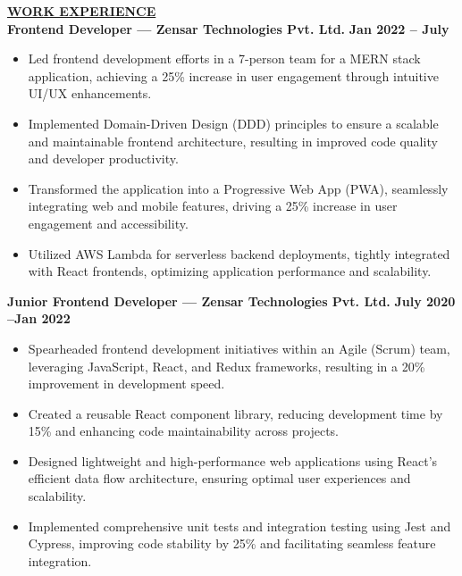 \documentclass{article}
\begin{document}

\noindent \textbf{\underline{WORK EXPERIENCE}} \\
\noindent \textbf{Frontend Developer — Zensar Technologies Pvt. Ltd.}
\hfill \textbf{Jan 2022 – July}
\begin{itemize}[noitemsep,nolistsep,leftmargin=*]
     \item Led frontend development efforts in a 7-person team for a MERN stack application, achieving a 25\% increase in user engagement through intuitive UI/UX enhancements.
    \item Implemented Domain-Driven Design (DDD) principles to ensure a scalable and maintainable frontend architecture, resulting in improved code quality and developer productivity.
    \item Transformed the application into a Progressive Web App (PWA), seamlessly integrating web and mobile features, driving a 25\% increase in user engagement and accessibility.
    \item Utilized AWS Lambda for serverless backend deployments, tightly integrated with React frontends, optimizing application performance and scalability.
\end{itemize}


\noindent \textbf{Junior Frontend Developer — Zensar Technologies Pvt. Ltd.} \hfill \textbf{July 2020 –Jan 2022}
\begin{itemize}[noitemsep,nolistsep,leftmargin=*]
      \item Spearheaded frontend development initiatives within an Agile (Scrum) team, leveraging JavaScript, React, and Redux frameworks, resulting in a 20\% improvement in development speed.
    \item Created a reusable React component library, reducing development time by 15\% and enhancing code maintainability across projects.
    \item Designed lightweight and high-performance web applications using React's efficient data flow architecture, ensuring optimal user experiences and scalability.
    \item Implemented comprehensive unit tests and integration testing using Jest and Cypress, improving code stability by 25\% and facilitating seamless feature integration.\\
\end{itemize}
\end{document}
